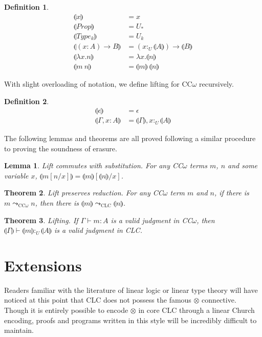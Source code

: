 \documentclass[sigplan,screen,review,authordraft]{acmart}
\newtheorem{theorem}{Theorem}[section]
\newtheorem{lemma}[theorem]{Lemma}
\theoremstyle{definition}
\newtheorem{definition}{Definition}[section]
\newcommand{\utype}{:_{\scriptscriptstyle U}}
\newcommand{\step}{\leadsto}
\newcommand{\lift}[1]{\llparenthesis #1 \rrparenthesis}
\begin{document}
  \begin{definition}
    \begin{align*}
      \lift{x} &= x \\
      \lift{Prop} &= U_* \\
      \lift{Type_k} &= U_k \\
      \lift{(x : A) \rightarrow B} &= (x \utype \lift{A}) \rightarrow \lift{B} \\
      \lift{\lambda x.n} &= \lambda x.\lift{n} \\
      \lift{m\ n} &= \lift{m}\ \lift{n}
    \end{align*}
  \end{definition}

  With slight overloading of notation, we define lifting for CC$\omega$ recursively.
  \begin{definition}
    \begin{align*}
      \lift{\epsilon} &= \epsilon \\
      \lift{\Gamma, x : A} &= \lift{\Gamma}, x \utype \lift{A}
    \end{align*}
  \end{definition}

  The following lemmas and theorems are all proved following a similar procedure to proving the soundness of erasure.
  \begin{lemma}
    Lift commutes with substitution. For any CC$\omega$ terms $m$, $n$ and some variable $x$, $\lift{m[n/x]} = \lift{m}[\lift{n}/x]$.
  \end{lemma}

  \begin{theorem}
    Lift preserves reduction. For any CC$\omega$ term $m$ and $n$, if there is $m \step_{\scriptscriptstyle \text{CC}\omega} n$, then there is $\lift{m} \step_{\scriptscriptstyle \text{CLC}} \lift{n}$.
  \end{theorem}

  \begin{theorem}
    Lifting. If $\Gamma \vdash m : A$ is a valid judgment in CC$\omega$, then $\lift{\Gamma} \vdash \lift{m} \utype \lift{A}$ is a valid judgment in CLC.
  \end{theorem}

  \section{Extensions}
  Readers familiar with the literature of linear logic or linear type theory will have noticed at this point that CLC does not possess the famous $\otimes$ connective. Though it is entirely possible to encode $\otimes$ in core CLC through a linear Church encoding, proofs and programs written in this style will be incredibly difficult to maintain. 
\end{document}
